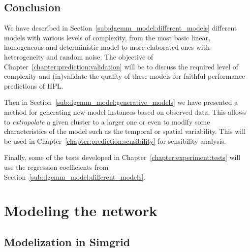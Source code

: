         \subsection{Conclusion}%
            We have described in Section~\ref{sub:dgemm_model:different_models} different models with various levels of
            complexity, from the most basic linear, homogeneous and deterministic model to more elaborated ones with
            heterogeneity and random noise. The objective of Chapter~\ref{chapter:prediction:validation} will be to
            discuss the required level of complexity and (in)validate the quality of these models for faithful
            performance predictions of HPL.

            Then in Section~\ref{sub:dgemm_model:generative_models} we have presented a method for generating new model
            instances based on observed data. This allows to \emph{extrapolate} a given cluster to a larger one or even
            to modify some characteristics of the model such as the temporal or spatial variability. This will be used
            in Chapter~\ref{chapter:prediction:sensibility} for sensibility analysis.

            Finally, some of the tests developed in Chapter~\ref{chapter:experiment:tests} will use the regression
            coefficients from Section~\ref{sub:dgemm_model:different_models}.

    \section{Modeling the network}
    \label{sec:network_model}

        \subsection{Modelization in Simgrid}%

